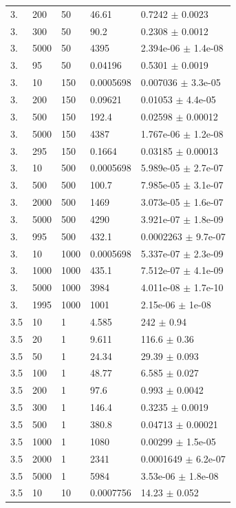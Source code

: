 \begin{longtable}{lllll}
	3. & 200 & 50 & 46.61 & 0.7242 $\pm$ 0.0023 \\
	3. & 300 & 50 & 90.2 & 0.2308 $\pm$ 0.0012 \\
	3. & 5000 & 50 & 4395 & 2.394e-06 $\pm$ 1.4e-08 \\
	3. & 95 & 50 & 0.04196 & 0.5301 $\pm$ 0.0019 \\
	3. & 10 & 150 & 0.0005698 & 0.007036 $\pm$ 3.3e-05 \\
	3. & 200 & 150 & 0.09621 & 0.01053 $\pm$ 4.4e-05 \\
	3. & 500 & 150 & 192.4 & 0.02598 $\pm$ 0.00012 \\
	3. & 5000 & 150 & 4387 & 1.767e-06 $\pm$ 1.2e-08 \\
	3. & 295 & 150 & 0.1664 & 0.03185 $\pm$ 0.00013 \\
	3. & 10 & 500 & 0.0005698 & 5.989e-05 $\pm$ 2.7e-07 \\
	3. & 500 & 500 & 100.7 & 7.985e-05 $\pm$ 3.1e-07 \\
	3. & 2000 & 500 & 1469 & 3.073e-05 $\pm$ 1.6e-07 \\
	3. & 5000 & 500 & 4290 & 3.921e-07 $\pm$ 1.8e-09 \\
	3. & 995 & 500 & 432.1 & 0.0002263 $\pm$ 9.7e-07 \\
	3. & 10 & 1000 & 0.0005698 & 5.337e-07 $\pm$ 2.3e-09 \\
	3. & 1000 & 1000 & 435.1 & 7.512e-07 $\pm$ 4.1e-09 \\
	3. & 5000 & 1000 & 3984 & 4.011e-08 $\pm$ 1.7e-10 \\
	3. & 1995 & 1000 & 1001 & 2.15e-06 $\pm$ 1e-08 \\
	3.5 & 10 & 1 & 4.585 & 242 $\pm$ 0.94 \\
	3.5 & 20 & 1 & 9.611 & 116.6 $\pm$ 0.36 \\
	3.5 & 50 & 1 & 24.34 & 29.39 $\pm$ 0.093 \\
	3.5 & 100 & 1 & 48.77 & 6.585 $\pm$ 0.027 \\
	3.5 & 200 & 1 & 97.6 & 0.993 $\pm$ 0.0042 \\
	3.5 & 300 & 1 & 146.4 & 0.3235 $\pm$ 0.0019 \\
	3.5 & 500 & 1 & 380.8 & 0.04713 $\pm$ 0.00021 \\
	3.5 & 1000 & 1 & 1080 & 0.00299 $\pm$ 1.5e-05 \\
	3.5 & 2000 & 1 & 2341 & 0.0001649 $\pm$ 6.2e-07 \\
	3.5 & 5000 & 1 & 5984 & 3.53e-06 $\pm$ 1.8e-08 \\
	3.5 & 10 & 10 & 0.0007756 & 14.23 $\pm$ 0.052 \\

\end{longtable}
